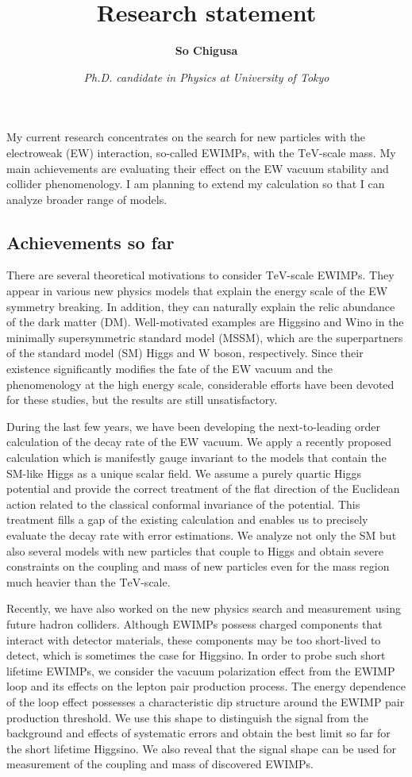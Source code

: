 \documentclass[12pt,notitlepage]{book}
\title{\vspace*{-3cm}Research statement}
\author{\textbf{So Chigusa}}
\date{\vspace*{-4mm}\textit{Ph.D. candidate in Physics at University of Tokyo}}
\begin{document}
\maketitle

My current research concentrates on the search for new particles with
the electroweak (EW) interaction, so-called EWIMPs, with the
$\mathrm{TeV}$-scale mass.  My main achievements are evaluating their
effect on the EW vacuum stability and collider phenomenology.  I am
planning to extend my calculation so that I can analyze broader range of
models.

\vspace*{-2mm}
\subsection*{Achievements so far}

There are several theoretical motivations to consider
$\mathrm{TeV}$-scale EWIMPs.  They appear in various new physics models
that explain the energy scale of the EW symmetry breaking.  In addition,
they can naturally explain the relic abundance of the dark matter (DM).
Well-motivated examples are Higgsino and Wino in the minimally
supersymmetric standard model (MSSM), which are the superpartners of the
standard model (SM) Higgs and W boson, respectively.  Since their
existence significantly modifies the fate of the EW vacuum and the
phenomenology at the high energy scale, considerable efforts have been
devoted for these studies, but the results are still unsatisfactory.

During the last few years, we have been developing the next-to-leading
order calculation of the decay rate of the EW vacuum.  We apply a
recently proposed calculation which is manifestly gauge invariant to the
models that contain the SM-like Higgs as a unique scalar field.  We
assume a purely quartic Higgs potential and provide the correct
treatment of the flat direction of the Euclidean action related to the
classical conformal invariance of the potential.  This treatment fills a
gap of the existing calculation and enables us to precisely evaluate the
decay rate with error estimations.  We analyze not only the SM but also
several models with new particles that couple to Higgs and obtain severe
constraints on the coupling and mass of new particles even for the mass
region much heavier than the $\mathrm{TeV}$-scale.

Recently, we have also worked on the new physics search and measurement
using future hadron colliders.  Although EWIMPs possess charged
components that interact with detector materials, these components may
be too short-lived to detect, which is sometimes the case for Higgsino.
In order to probe such short lifetime EWIMPs, we consider the vacuum
polarization effect from the EWIMP loop and its effects on the lepton
pair production process.  The energy dependence of the loop effect
possesses a characteristic dip structure around the EWIMP pair
production threshold.  We use this shape to distinguish the signal from
the background and effects of systematic errors and obtain the best
limit so far for the short lifetime Higgsino.  We also reveal that the
signal shape can be used for measurement of the coupling and mass of
discovered EWIMPs.
\end{document}
